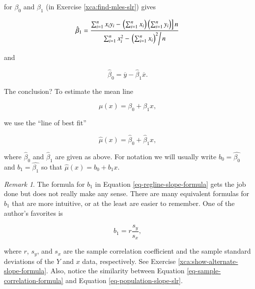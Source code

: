 \documentclass[]{book}
\numberwithin{equation}{chapter}
\numberwithin{figure}{chapter}
\theoremstyle{plain}
\theoremstyle{definition}
\theoremstyle{remark}
\newtheorem{rem}[thm]{Remark}
\theoremstyle{definition}
\theoremstyle{definition}
\theoremstyle{remark}
\begin{document}
for \(\beta_{0}\) and \(\beta_{1}\) (in Exercise
\ref{xca:find-mles-slr}) gives

\begin{equation}
\label{eq-regline-slope-formula}
\hat{\beta}_{1} = \frac{\sum_{i = 1}^{n}x_{i}y_{i} - \left.\left(\sum_{i = 1}^{n}x_{i}\right)\left(\sum_{i = 1}^{n}y_{i}\right)\right] n}{\sum_{i = 1}^{n}x_{i}^{2} - \left.\left(\sum_{i = 1}^{n}x_{i}\right)^{2}\right/ n}
\end{equation}

and

\begin{equation}
\hat{\beta}_{0} = \overline{y} - \hat{\beta}_{1}\overline{x}.
\end{equation}

The conclusion? To estimate the mean line

\begin{equation}
\mu(x) = \beta_{0} + \beta_{1}x,
\end{equation}

we use the ``line of best fit''

\begin{equation}
\hat{\mu}(x) = \hat{\beta}_{0} + \hat{\beta}_{1}x,
\end{equation}

where \(\hat{\beta}_{0}\) and \(\hat{\beta}_{1}\) are given as above.
For notation we will usually write \(b_{0} = \hat{\beta_{0}}\) and
\(b_{1}=\hat{\beta_{1}}\) so that \(\hat{\mu}(x) = b_{0} + b_{1}x\).

\bigskip

\begin{rem}
The formula for \(b_{1}\) in Equation \eqref{eq-regline-slope-formula}
gets the job done but does not really make any sense. There are many
equivalent formulas for \(b_{1}\) that are more intuitive, or at the
least are easier to remember. One of the author's favorites is

\begin{equation}
\label{eq-sample-correlation-formula} 
b_{1} = r\frac{s_{y}}{s_{x}},
\end{equation}

where \(r\), \(s_{y}\), and \(s_{x}\) are the sample correlation
coefficient and the sample standard deviations of the \(Y\) and \(x\)
data, respectively. See Exercise \ref{xca:show-alternate-slope-formula}.
Also, notice the similarity between Equation
\eqref{eq-sample-correlation-formula} and Equation
\eqref{eq-population-slope-slr}.
\end{rem}
\end{document}
